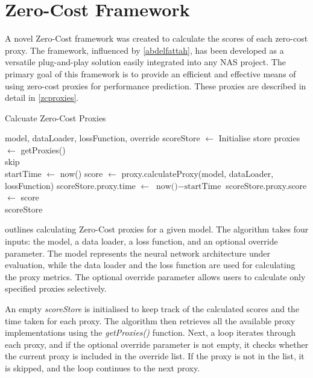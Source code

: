 \section{Zero-Cost Framework}\label{sec:zc-framework}

A novel Zero-Cost framework was created to calculate the scores of each zero-cost proxy. The framework, influenced by \cref{abdelfattah}, has been developed as a versatile plug-and-play solution easily integrated into any NAS project. The primary goal of this framework is to provide an efficient and effective means of using zero-cost proxies for performance prediction. These proxies are described in detail in \cref{zcproxies}.

\begin{algorithm}
    \begin{algorithmic}[1]
        \caption{Calcuate Zero-Cost Proxies}\label{alg:zc_framework}
        \Require model, dataLoader, lossFunction, override
        \State scoreStore $\gets$ Initialise store
        \State proxies $\gets$ getProxies() 
        \\
                    \State skip
                \EndIf
            \EndIf
            \\
            \State startTime $\gets$ now()
            \State score $\gets$ proxy.calculateProxy(model, dataLoader, lossFunction)
            \State scoreStore.proxy.time $\gets$ $\text{now()}-\text{startTime}$
            \State scoreStore.proxy.score $\gets$ score
        \EndFor
        \\
        \State \Return scoreStore
        
    \end{algorithmic}
\end{algorithm}

 outlines calculating Zero-Cost proxies for a given model. The algorithm takes four inputs: the model, a data loader, a loss function, and an optional override parameter. The model represents the neural network architecture under evaluation, while the data loader and the loss function are used for calculating the proxy metrics. The optional override parameter allows users to calculate only specified proxies selectively.

An empty \textit{scoreStore} is initialised to keep track of the calculated scores and the time taken for each proxy. The algorithm then retrieves all the available proxy implementations using the \textit{getProxies()} function. Next, a loop iterates through each proxy, and if the optional override parameter is not empty, it checks whether the current proxy is included in the override list. If the proxy is not in the list, it is skipped, and the loop continues to the next proxy.

